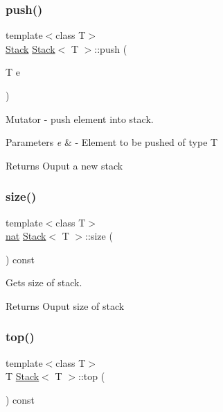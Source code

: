\subsubsection{\texorpdfstring{push()}{push()}}
{\footnotesize\ttfamily template$<$class T$>$ \\
\hyperlink{class_stack}{Stack} \hyperlink{class_stack}{Stack}$<$ T $>$\+::push (\begin{DoxyParamCaption}\item[{T}]{e }\end{DoxyParamCaption})}



Mutator -\/ push element into stack. 


\begin{DoxyParams}{Parameters}
{\em e} & -\/ Element to be pushed of type T \\
\hline
\end{DoxyParams}
\begin{DoxyReturn}{Returns}
Ouput a new stack 
\end{DoxyReturn}
\mbox{\label{class_stack_ab9892502a02b845f92ef0c631270f1df}} 
\subsubsection{\texorpdfstring{size()}{size()}}
{\footnotesize\ttfamily template$<$class T$>$ \\
\hyperlink{_card_types_8h_a56638ee9d162e8cce3a15f92d2023d6e}{nat} \hyperlink{class_stack}{Stack}$<$ T $>$\+::size (\begin{DoxyParamCaption}{ }\end{DoxyParamCaption}) const}



Gets size of stack. 

\begin{DoxyReturn}{Returns}
Ouput size of stack 
\end{DoxyReturn}
\mbox{\label{class_stack_a1931814ad68db1eaedabdb37fa0fe494}} 
\subsubsection{\texorpdfstring{top()}{top()}}
{\footnotesize\ttfamily template$<$class T$>$ \\
T \hyperlink{class_stack}{Stack}$<$ T $>$\+::top (\begin{DoxyParamCaption}{ }\end{DoxyParamCaption}) const}



